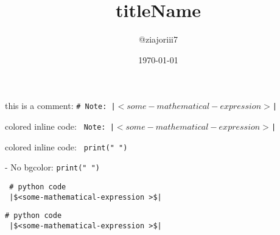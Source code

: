 \documentclass[12pt]{article}
\title{titleName}
\author{@ziajoriii7}
\date{\myformat\today}
\newcommand{\inlinecode}[1]{\colorbox{alice}{\texttt{#1}}}
\begin{document}
\maketitle


this is a comment: \inlinecode{# Note: |$<some-mathematical-expression >$|}
\newline

colored inline code: \inlinecode{
    Note: |$<some-mathematical-expression >$|
}

colored inline code: \inlinecode{
    print(" ")
}

- No bgcolor: \texttt{print(" ")}
\begin{verbatim}
 # python code
 |$<some-mathematical-expression >$|
\end{verbatim}

\begin{verbatim}
# python code
 |$<some-mathematical-expression >$|
\end{verbatim}



\lipsum[1-7]
\end{document}
